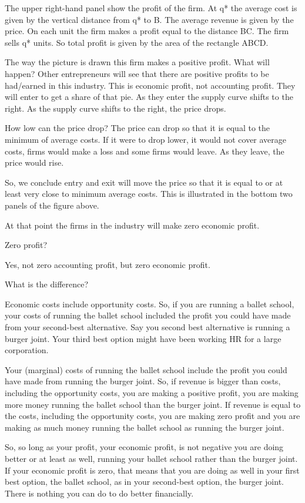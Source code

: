 \documentclass[
]{book}
\begin{document}
The upper right-hand panel show the profit of the firm. At q* the average cost is given by the vertical distance from q* to B. The average revenue is given by the price. On each unit the firm makes a profit equal to the distance BC. The firm sells q* units. So total profit is given by the area of the rectangle ABCD.

The way the picture is drawn this firm makes a positive profit. What will happen? Other entrepreneurs will see that there are positive profits to be had/earned in this industry. This is economic profit, not accounting profit. They will enter to get a share of that pie. As they enter the supply curve shifts to the right. As the supply curve shifts to the right, the price drops.

How low can the price drop? The price can drop so that it is equal to the minimum of average costs. If it were to drop lower, it would not cover average costs, firms would make a loss and some firms would leave. As they leave, the price would rise.

So, we conclude entry and exit will move the price so that it is equal to or at least very close to minimum average costs. This is illustrated in the bottom two panels of the figure above.

At that point the firms in the industry will make zero economic profit.

Zero profit?

Yes, not zero accounting profit, but zero economic profit.

What is the difference?

Economic costs include opportunity costs. So, if you are running a ballet school, your costs of running the ballet school included the profit you could have made from your second-best alternative. Say you second best alternative is running a burger joint. Your third best option might have been working HR for a large corporation.

Your (marginal) costs of running the ballet school include the profit you could have made from running the burger joint. So, if revenue is bigger than costs, including the opportunity costs, you are making a positive profit, you are making more money running the ballet school than the burger joint. If revenue is equal to the costs, including the opportunity costs, you are making zero profit and you are making as much money running the ballet school as running the burger joint.

So, so long as your profit, your economic profit, is not negative you are doing better or at least as well, running your ballet school rather than the burger joint. If your economic profit is zero, that means that you are doing as well in your first best option, the ballet school, as in your second-best option, the burger joint. There is nothing you can do to do better financially.
\end{document}
